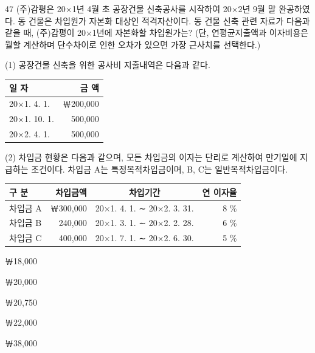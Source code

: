 \begin{question}{47}
(주)감평은 20×1년 4월 초 공장건물 신축공사를 시작하여 20×2년 9월 말 완공하였다. 동 건물은 차입원가 자본화 대상인 적격자산이다. 동 건물 신축 관련 자료가 다음과 같을 때, (주)감평이 20×1년에 자본화할 차입원가는? (단, 연평균지출액과 이자비용은 월할 계산하며 단수차이로 인한 오차가 있으면 가장 근사치를 선택한다.)
\begin{framedtext}
(1) 공장건물 신축을 위한 공사비 지출내역은 다음과 같다. \par
{\small\centering\begin{tabular}{@{}lr@{}}
일 자 & 금 액 \\\hline
20×1. 4. 1. & ￦200,000 \\
20×1. 10. 1. & 500,000 \\
20×2. 4. 1. & 500,000 \\
\end{tabular}\par}
(2) 차입금 현황은 다음과 같으며, 모든 차입금의 이자는 단리로 계산하여 만기일에 지급하는 조건이다. 차입금 A는 특정목적차입금이며, B, C는 일반목적차입금이다. \par
{\small\centering\begin{tabular}{@{}lrcr@{}}
구 분 & 차입금액 & 차입기간 & 연 이자율 \\\hline
차입금 A & ￦300,000 & 20×1. 4. 1. ∼ 20×2. 3. 31. & 8 \% \\
차입금 B & 240,000 & 20×1. 3. 1. ∼ 20×2. 2. 28. & 6 \% \\
차입금 C & 400,000 & 20×1. 7. 1. ∼ 20×2. 6. 30. & 5 \% \\
\end{tabular}\par}
\end{framedtext}
\begin{choices}
  \item ￦18,000
  \item ￦20,000
  \item ￦20,750
  \item ￦22,000
  \item ￦38,000
\end{choices}
\end{question}
